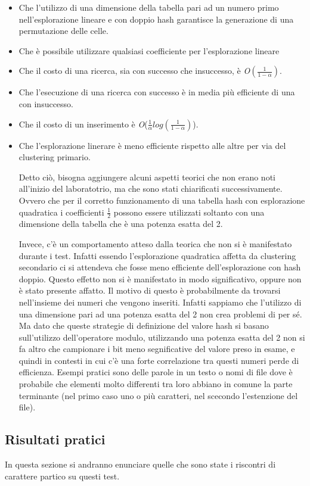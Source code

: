 \documentclass{article}
\newcommand{\bigO}{\emph{O}}
\begin{document}
\begin{itemize}
\item Che l'utilizzo di una dimensione della tabella pari ad un numero primo nell'esplorazione lineare e con doppio hash garantisce la generazione di una permutazione delle celle.
\item Che è possibile utilizzare qualsiasi coefficiente per l'esplorazione lineare
\item Che il costo di una ricerca, sia con successo che insuccesso, è \bigO$(\frac{1}{1 - \alpha})$.
\item Che l'esecuzione di una ricerca con successo è in media più efficiente di una con insuccesso.
\item Che il costo di un inserimento è \bigO($\frac{1}{\alpha}log(\frac{1}{1 - \alpha})$).
\item Che l'esplorazione linerare è meno efficiente rispetto alle altre per via del clustering primario.

Detto ciò, bisogna aggiungere alcuni aspetti teorici che non erano noti all'inizio del laboratotrio, ma che sono stati chiarificati successivamente. Ovvero che per il corretto funzionamento di una tabella hash con esplorazione quadratica i coefficienti $\frac{1}{2}$ possono essere utilizzati soltanto con una dimensione della tabella che è una potenza esatta del 2.

Invece, c'è un comportamento atteso dalla teorica che non si è manifestato durante i test. Infatti essendo l'esplorazione quadratica affetta da clustering secondario ci si attendeva che fosse meno efficiente dell'esplorazione con hash doppio. Questo effetto non si è manifestato in modo significativo, oppure non è stato presente affatto. Il motivo di questo è probabilmente da trovarsi nell'insieme dei numeri che vengono inseriti. Infatti sappiamo che l'utilizzo di una dimensione pari ad una potenza esatta del 2 non crea problemi di per sé. Ma dato che queste strategie di definizione del valore hash si basano sull'utilizzo dell'operatore modulo, utilizzando una potenza esatta del 2 non si fa altro che campionare i bit meno segnificative del valore preso in esame, e quindi in contesti in cui c'è una forte correlazione tra questi numeri perde di efficienza. Esempi pratici sono delle parole in un testo o nomi di file dove è probabile che elementi molto differenti tra loro abbiano in comune la parte terminante (nel primo caso uno o più caratteri, nel scecondo l'estenzione del file). 
\end{itemize}

\subsection{Risultati pratici}
In questa sezione si andranno enunciare quelle che sono state i riscontri di carattere partico su questi test.
\end{document}
